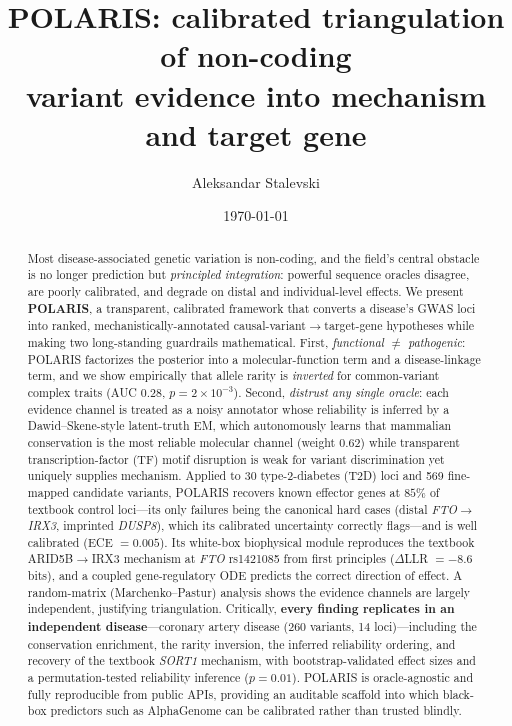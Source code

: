 \documentclass[10pt]{article}
\title{\vspace{-2.2em}\textbf{\color{navy}\Large POLARIS: calibrated triangulation of non-coding\\[-1mm] variant evidence into mechanism and target gene}}
\author[1]{Aleksandar Stalevski}
\affil[1]{\small POLARIS Working Group $\cdot$ computational regulatory genomics}
\date{\vspace{-1.2em}\small\today}
\begin{document}
\maketitle
\vspace{-2.2em}

\begin{abstract}
\noindent Most disease-associated genetic variation is non-coding, and the field's central
obstacle is no longer prediction but \emph{principled integration}: powerful sequence oracles
disagree, are poorly calibrated, and degrade on distal and individual-level effects. We present
\textbf{POLARIS}, a transparent, calibrated framework that converts a disease's GWAS loci into
ranked, mechanistically-annotated causal-variant$\rightarrow$target-gene hypotheses while making
two long-standing guardrails mathematical. First, \emph{functional $\neq$ pathogenic}: POLARIS
factorizes the posterior into a molecular-function term and a disease-linkage term, and we show
empirically that allele rarity is \emph{inverted} for common-variant complex traits
(AUC $0.28$, $p=2\times10^{-3}$). Second, \emph{distrust any single oracle}: each evidence channel
is treated as a noisy annotator whose reliability is inferred by a Dawid--Skene-style latent-truth
EM, which autonomously learns that mammalian conservation is the most reliable molecular channel
(weight $0.62$) while transparent transcription-factor (TF) motif disruption is weak for variant
discrimination yet uniquely supplies mechanism. Applied to 30 type-2-diabetes (T2D) loci and
569 fine-mapped candidate variants, POLARIS recovers known effector genes at $85\%$ of textbook
control loci---its only failures being the canonical hard cases (distal \emph{FTO}$\rightarrow$\emph{IRX3},
imprinted \emph{DUSP8}), which its calibrated uncertainty correctly flags---and is well calibrated
(ECE $=0.005$). Its white-box biophysical module reproduces the textbook ARID5B$\rightarrow$IRX3
mechanism at \emph{FTO} rs1421085 from first principles ($\Delta$LLR $=-8.6$ bits), and a coupled
gene-regulatory ODE predicts the correct direction of effect. A random-matrix (Marchenko--Pastur)
analysis shows the evidence channels are largely independent, justifying triangulation. Critically,
\textbf{every finding replicates in an independent disease}---coronary artery disease (260 variants,
14 loci)---including the conservation enrichment, the rarity inversion, the inferred reliability
ordering, and recovery of the textbook \emph{SORT1} mechanism, with bootstrap-validated effect sizes
and a permutation-tested reliability inference ($p=0.01$). POLARIS is oracle-agnostic and fully
reproducible from public APIs, providing an auditable scaffold into which black-box predictors such
as AlphaGenome can be calibrated rather than trusted blindly.
\end{abstract}
\end{document}
